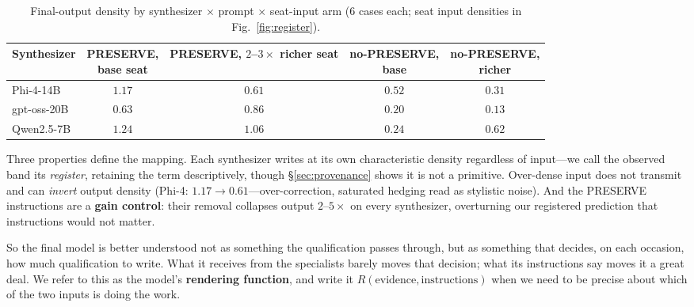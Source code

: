 \documentclass[11pt]{article}
\begin{document}
\begin{table}[t]
\centering
\caption{Final-output density by synthesizer $\times$ prompt $\times$ seat-input
arm (6 cases each; seat input densities in Fig.~\ref{fig:register}).}
\label{tab:register}
\begin{tabular}{lcccc}
\toprule
Synthesizer & \makecell{PRESERVE,\\base seat} & \makecell{PRESERVE,\\$2$--$3\times$ richer seat} & \makecell{no-PRESERVE,\\base} & \makecell{no-PRESERVE,\\richer} \\
\midrule
Phi-4-14B & $1.17$ & $0.61$ & $0.52$ & $0.31$ \\
gpt-oss-20B & $0.63$ & $0.86$ & $0.20$ & $0.13$ \\
Qwen2.5-7B & $1.24$ & $1.06$ & $0.24$ & $0.62$ \\
\bottomrule
\end{tabular}
\end{table}

Three properties define the mapping. Each synthesizer writes at its own
characteristic density regardless of input---we call the observed band its
\emph{register}, retaining the term descriptively, though
\S\ref{sec:provenance} shows it is not a primitive. Over-dense input does not
transmit and can \emph{invert} output density (Phi-4: $1.17 \rightarrow
0.61$---over-correction, saturated hedging read as stylistic noise). And the
PRESERVE instructions are a \textbf{gain control}: their removal collapses
output $2$--$5\times$ on every synthesizer, overturning our registered
prediction that instructions would not matter.

So the final model is better understood not as something the qualification
passes through, but as something that decides, on each occasion, how much
qualification to write. What it receives from the specialists barely moves
that decision; what its instructions say moves it a great deal. We refer to
this as the model's \textbf{rendering function}, and write it
$R(\text{evidence}, \text{instructions})$ when we need to be precise about
which of the two inputs is doing the work.
\end{document}

